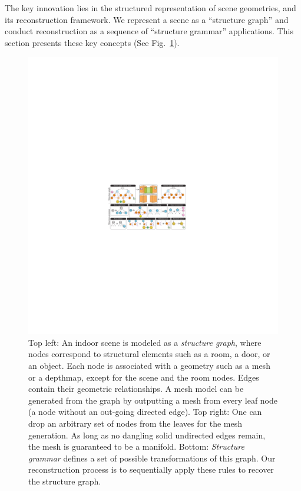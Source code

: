 The key innovation lies in the structured representation of scene
geometries, and its reconstruction framework. We represent a scene as a
``structure graph'' and conduct reconstruction as a
sequence of ``structure grammar'' applications. This section presents
these key concepts (See Fig.~\ref{fig:graph_grammar}).

\begin{figure}[tb]
\begin{center}
 \includegraphics[width=150mm]{../figures/grammar.pdf} 
 \end{center}
 \caption{Top
 left: An indoor scene is modeled as a {\em structure graph}, where
 nodes correspond to structural elements such as a room, a door, or an
 object. Each node is associated with a geometry such as a mesh or a
 depthmap, except for the scene and the room nodes. Edges contain their
 geometric relationships. A mesh model can be generated from the graph
 by outputting a mesh from every leaf node (a node without an out-going
 directed edge). Top right: One can drop an arbitrary set of nodes from
 the leaves for the mesh generation. As long as no dangling solid
 undirected edges remain, the mesh is guaranteed to be a
 manifold. Bottom: {\em Structure grammar} defines a set of possible
 transformations of this graph. Our reconstruction process is
 to sequentially apply these rules to recover the structure graph.}
 \label{fig:graph_grammar}
 \vspace{-0.325cm}
\end{figure}

